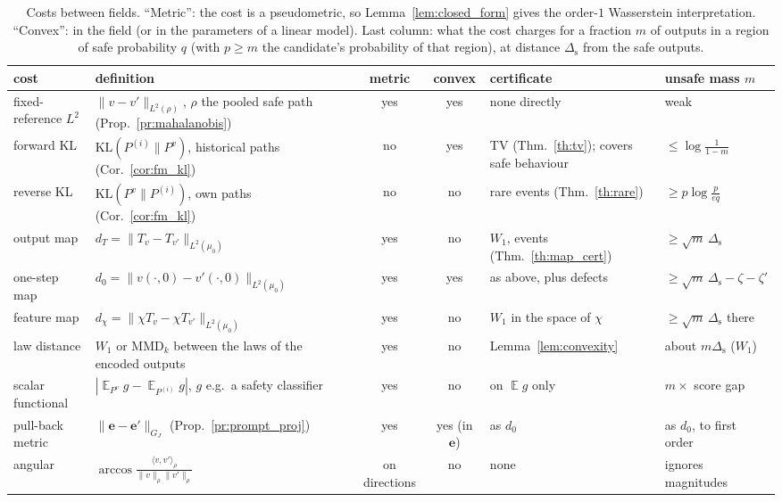 \documentclass{article}
\DeclareMathOperator{\E}{\mathbb{E}}
\newcommand{\Pv}[1]{P^{#1}}                         %
\newcommand{\KL}{\mathrm{KL}}
\newcommand{\be}{\mathbf{e}}                       %
\theoremstyle{plain}
\begin{document}
\begin{table}[!tbp]
\centering
\caption{Costs between fields. ``Metric'': the cost is a pseudometric, so Lemma~\ref{lem:closed_form} gives
the order-$1$ Wasserstein interpretation. ``Convex'': in the field (or in the parameters of a linear
model). Last column: what the cost charges for a fraction $m$ of outputs in a region of safe
probability $q$ (with $p\geq m$ the candidate's probability of that region), at distance $\Delta_{\mathrm{s}}$
from the safe outputs.}
\label{tab:costs}
\footnotesize
\begin{tabularx}{\textwidth}{>{\raggedright\arraybackslash}p{2.3cm} >{\raggedright\arraybackslash}X c c >{\raggedright\arraybackslash}p{2.7cm} >{\raggedright\arraybackslash}p{2.3cm}}
\toprule
cost & definition & metric & convex & certificate & unsafe mass $m$\\
\midrule
fixed-reference $L^2$ & $\|v-v'\|_{L^2(\rho)}$, $\rho$ the pooled safe path (Prop.~\ref{pr:mahalanobis}) & yes & yes & none directly & weak\\
forward KL & $\KL(P^{(i)}\|\Pv{v})$, historical paths (Cor.~\ref{cor:fm_kl}) & no & yes & TV (Thm.~\ref{th:tv}); covers safe behaviour & $\leq\log\frac{1}{1-m}$\\
reverse KL & $\KL(\Pv{v}\|P^{(i)})$, own paths (Cor.~\ref{cor:fm_kl}) & no & no & rare events (Thm.~\ref{th:rare}) & $\geq p\log\frac{p}{eq}$\\
output map & $d_T=\|T_v-T_{v'}\|_{L^2(\mu_0)}$ & yes & no & $W_1$, events (Thm.~\ref{th:map_cert}) & $\geq\sqrt m\,\Delta_{\mathrm{s}}$\\
one-step map & $d_0=\|v(\cdot,0)-v'(\cdot,0)\|_{L^2(\mu_0)}$ & yes & yes & as above, plus defects & $\geq\sqrt m\,\Delta_{\mathrm{s}}-\zeta-\zeta'$\\
feature map & $d_\chi=\|\chi T_v-\chi T_{v'}\|_{L^2(\mu_0)}$ & yes & no & $W_1$ in the space of $\chi$ & $\geq\sqrt m\,\Delta_{\mathrm{s}}$ there\\
law distance & $W_1$ or $\mathrm{MMD}_k$ between the laws of the encoded outputs & yes & no & Lemma~\ref{lem:convexity} & about $m\Delta_{\mathrm{s}}$ ($W_1$)\\
scalar functional & $|\E_{\Pv{v}}g-\E_{P^{(i)}}g|$, $g$ e.g.\ a safety classifier & yes & no & on $\E g$ only & $m\times$ score gap\\
pull-back metric & $\|\be-\be'\|_{G_J}$ (Prop.~\ref{pr:prompt_proj}) & yes & yes (in $\be$) & as $d_0$ & as $d_0$, to first order\\
angular & $\arccos\frac{\langle v,v'\rangle_\rho}{\|v\|_\rho\|v'\|_\rho}$ & on directions & no & none & ignores magnitudes\\
\bottomrule
\end{tabularx}
\end{table}
\end{document}
